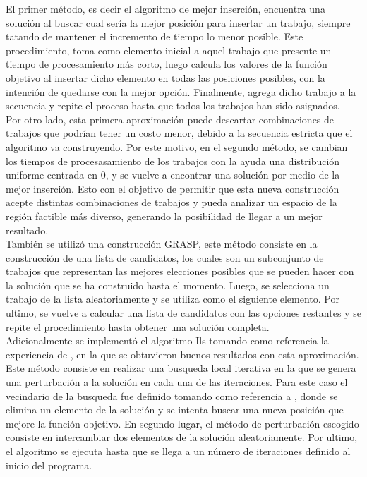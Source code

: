 \documentclass[10pt, twoside]{article}
\begin{document}
El primer método, es decir el algoritmo de mejor inserción, encuentra
una solución al buscar cual sería la mejor posición para insertar un trabajo,
siempre tatando de mantener el incremento de tiempo lo menor posible. Este
procedimiento, toma como elemento inicial a aquel trabajo que presente un tiempo de
procesamiento más corto, luego calcula los valores de la función objetivo
al insertar dicho elemento en todas las posiciones posibles, con la intención
de quedarse con la mejor opción. Finalmente, agrega dicho trabajo a la
secuencia y repite el proceso hasta que todos los trabajos han sido
asignados.\\

Por otro lado, esta primera aproximación puede descartar combinaciones de
trabajos que podrían tener un costo menor, debido a la secuencia estricta que el
algoritmo va construyendo. Por este motivo, en el segundo método, se cambian los
tiempos de procesasamiento de los trabajos con la ayuda una distribución
uniforme centrada en 0, y se vuelve a encontrar una solución por medio de la
mejor inserción. Esto con el objetivo de permitir que esta nueva construcción
acepte distintas combinaciones de trabajos y pueda analizar un espacio de la
región factible más diverso, generando la posibilidad de llegar a un mejor
resultado.\\

También se utilizó una construcción GRASP, este método consiste en la
construcción de una lista de candidatos, los cuales son un subconjunto
de trabajos que representan las mejores elecciones posibles que se pueden hacer
con la solución que se ha construido hasta el momento. Luego, se selecciona un
trabajo de la lista aleatoriamente y se utiliza como el siguiente elemento. Por
ultimo, se vuelve a calcular una lista de candidatos con las opciones restantes
y se repite el procedimiento hasta obtener una solución completa.\\

Adicionalmente se implementó el algoritmo Ils tomando como referencia la
experiencia de \cite{ils}, en la que se obtuvieron buenos resultados con esta
aproximación. Este método consiste en realizar una busqueda local iterativa en
la que se genera una perturbación a la solución en cada una de las iteraciones.
Para este caso el vecindario de la busqueda fue definido tomando como referencia
a \cite{localsearch}, donde se elimina un elemento de la solución y se intenta
buscar una nueva posición que mejore la función objetivo. En segundo lugar, el
método de perturbación escogido consiste en intercambiar dos elementos de la solución
aleatoriamente. Por ultimo, el algoritmo se ejecuta hasta que se llega a un
número de iteraciones definido al inicio del programa.\\
\end{document}
